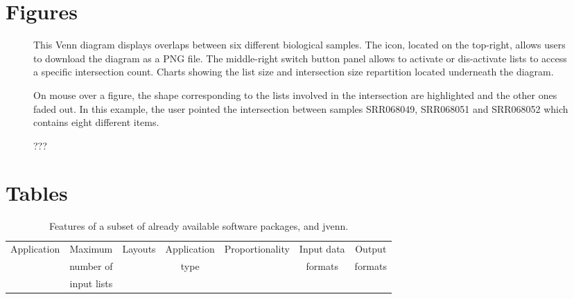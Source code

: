 \documentclass{bmcart}
\begin{document}
\begin{backmatter}


\section*{Figures}
  \begin{figure}[h!]
  \caption{
      This Venn diagram displays overlaps between six different biological
      samples. The icon, located on the top-right, allows users to download the
      diagram as a PNG file. The middle-right switch button
      panel allows to activate or dis-activate lists to access a specific
      intersection count. Charts showing the list size and intersection size 
      repartition located underneath the diagram.}\label{fig::features}
   \end{figure}

  \begin{figure}[h!]
  \caption{
      On mouse over a figure, the shape corresponding to the lists involved in
      the intersection are highlighted and the other ones faded out. In
      this example, the user pointed the intersection between samples SRR068049,
      SRR068051 and SRR068052 which contains eight different 
	  items.}\label{fig::edwards}
   \end{figure}
      
  \begin{figure}[h!]
  \caption{???}\label{fig::web}
  \end{figure}


\section*{Tables}

\begin{table}[h!]
\caption{Features of a subset of already available software packages, and 
jvenn.}\label{table::features}
	\begin{tabular}{c|cccccc}
		Application & Maximum & Layouts & Application &
		Proportionality & Input data & Output\\ 
		& number of & & type & & formats & formats \\
		& input lists & & & & & \\ \hline
		

\end{tabular}
\end{table}
\end{backmatter}
\end{document}
